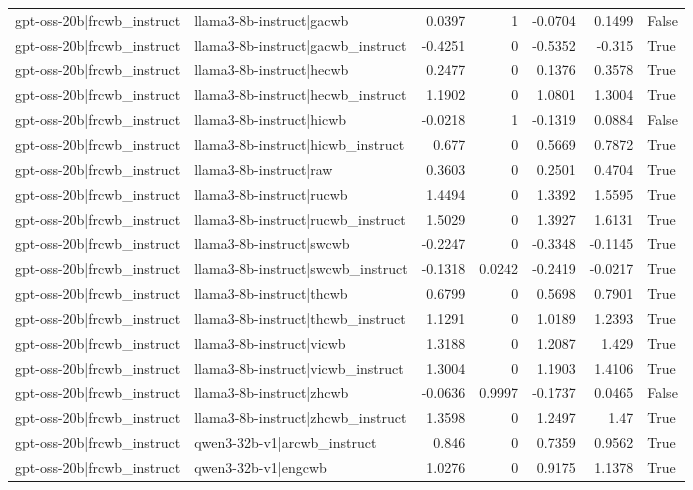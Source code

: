 \begin{table}
\begin{tabular}{l l r r r r l}
gpt-oss-20b|frcwb_instruct & llama3-8b-instruct|gacwb & 0.0397 & 1 & -0.0704 & 0.1499 & False \\
gpt-oss-20b|frcwb_instruct & llama3-8b-instruct|gacwb_instruct & -0.4251 & 0 & -0.5352 & -0.315 & True \\
gpt-oss-20b|frcwb_instruct & llama3-8b-instruct|hecwb & 0.2477 & 0 & 0.1376 & 0.3578 & True \\
gpt-oss-20b|frcwb_instruct & llama3-8b-instruct|hecwb_instruct & 1.1902 & 0 & 1.0801 & 1.3004 & True \\
gpt-oss-20b|frcwb_instruct & llama3-8b-instruct|hicwb & -0.0218 & 1 & -0.1319 & 0.0884 & False \\
gpt-oss-20b|frcwb_instruct & llama3-8b-instruct|hicwb_instruct & 0.677 & 0 & 0.5669 & 0.7872 & True \\
gpt-oss-20b|frcwb_instruct & llama3-8b-instruct|raw & 0.3603 & 0 & 0.2501 & 0.4704 & True \\
gpt-oss-20b|frcwb_instruct & llama3-8b-instruct|rucwb & 1.4494 & 0 & 1.3392 & 1.5595 & True \\
gpt-oss-20b|frcwb_instruct & llama3-8b-instruct|rucwb_instruct & 1.5029 & 0 & 1.3927 & 1.6131 & True \\
gpt-oss-20b|frcwb_instruct & llama3-8b-instruct|swcwb & -0.2247 & 0 & -0.3348 & -0.1145 & True \\
gpt-oss-20b|frcwb_instruct & llama3-8b-instruct|swcwb_instruct & -0.1318 & 0.0242 & -0.2419 & -0.0217 & True \\
gpt-oss-20b|frcwb_instruct & llama3-8b-instruct|thcwb & 0.6799 & 0 & 0.5698 & 0.7901 & True \\
gpt-oss-20b|frcwb_instruct & llama3-8b-instruct|thcwb_instruct & 1.1291 & 0 & 1.0189 & 1.2393 & True \\
gpt-oss-20b|frcwb_instruct & llama3-8b-instruct|vicwb & 1.3188 & 0 & 1.2087 & 1.429 & True \\
gpt-oss-20b|frcwb_instruct & llama3-8b-instruct|vicwb_instruct & 1.3004 & 0 & 1.1903 & 1.4106 & True \\
gpt-oss-20b|frcwb_instruct & llama3-8b-instruct|zhcwb & -0.0636 & 0.9997 & -0.1737 & 0.0465 & False \\
gpt-oss-20b|frcwb_instruct & llama3-8b-instruct|zhcwb_instruct & 1.3598 & 0 & 1.2497 & 1.47 & True \\
gpt-oss-20b|frcwb_instruct & qwen3-32b-v1|arcwb_instruct & 0.846 & 0 & 0.7359 & 0.9562 & True \\
gpt-oss-20b|frcwb_instruct & qwen3-32b-v1|engcwb & 1.0276 & 0 & 0.9175 & 1.1378 & True \\

\end{tabular}
\end{table}
